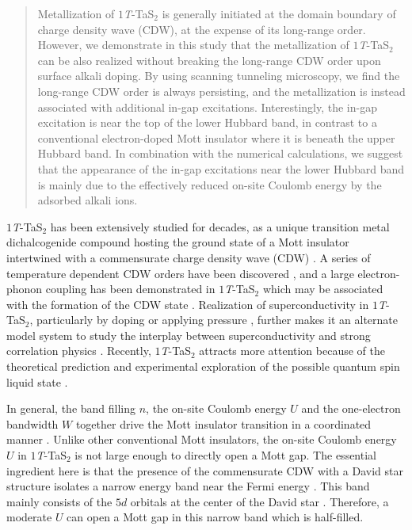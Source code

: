 \documentclass[aps,prl,reprint,groupedaddress,showpacs,amsfonts,amsmath,amssymb,superscriptaddress]{revtex4-1}
\begin{document}
\date{\today}

\begin{abstract}
Metallization of $1$\emph{T}-TaS$_{2}$ is generally initiated at the domain boundary of charge density wave (CDW), at the expense of its long-range order. However, we demonstrate in this study that the metallization of $1$\emph{T}-TaS$_{2}$ can be also realized without breaking the long-range CDW order upon surface alkali doping. By using scanning tunneling microscopy, we find the long-range CDW order is always persisting, and the metallization is instead associated with additional in-gap excitations. Interestingly, the in-gap excitation is near the top of the lower Hubbard band, in contrast to a conventional electron-doped Mott insulator where it is beneath the upper Hubbard band. In combination with the numerical calculations, we suggest that the appearance of the in-gap excitations near the lower Hubbard band is mainly due to the effectively reduced on-site Coulomb energy by the adsorbed alkali ions.
\end{abstract}

\maketitle

$1$\emph{T}-TaS$_{2}$ has been extensively studied for decades, as a unique transition metal dichalcogenide compound hosting the ground state of a Mott insulator \cite{J.Phys.Colloq.37.C4-165,Philos.Mag.B.39.229,Physica.B+C.99.183} intertwined with a commensurate charge density wave (CDW) \cite{PhysRevB.38.10734}. A series of temperature dependent CDW orders have been discovered \cite{Philos.Mag.B.39.229,PhysRevB.12.2220,Philos.Mag.31.255}, and a large electron-phonon coupling has been demonstrated in $1$\emph{T}-TaS$_{2}$ which may be associated with the formation of the CDW state \cite{BENEDEK19941,BENEDEK1994185}.
Realization of superconductivity in $1$\emph{T}-TaS$_{2}$, particularly by doping \cite{APL.102.192602,EPL.97.67005} or applying pressure \cite{nmat2318}, further makes it an alternate model system to study the interplay between superconductivity and strong correlation physics \cite{PhysRevB.94.125126}. Recently, $1$\emph{T}-TaS$_{2}$ attracts more attention because of the theoretical prediction and experimental exploration of the possible quantum spin liquid state \cite{Anderson1973.153,nphys4212,Law6996,npj.2.42,PhysRevB.96.195131,PhysRevB.96.081111}.

In general, the band filling $n$, the on-site Coulomb energy $U$ and the one-electron bandwidth $W$ together drive the Mott insulator transition in a coordinated manner \cite{RevModPhys.70.1039}. Unlike other conventional Mott insulators, the on-site Coulomb energy $U$ in $1$\emph{T}-TaS$_{2}$ is not large enough to directly open a Mott gap.
The essential ingredient here is that the presence of the commensurate CDW with a David star structure isolates a narrow energy band near the Fermi energy \cite{Physica.B+C.99.51}. This band mainly consists of the $5d$ orbitals at the center of the David star \cite{PhysRevB.73.073106}. Therefore, a moderate $U$ can open a Mott gap in this narrow band
which is half-filled.
\end{document}
